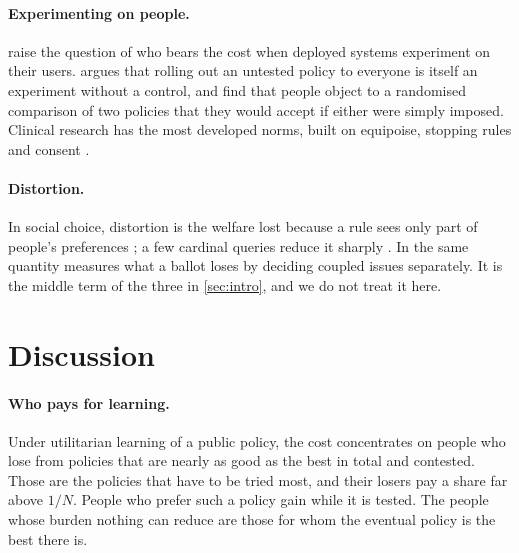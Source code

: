 \documentclass[11pt,a4paper]{article}
\theoremstyle{plain}
\theoremstyle{definition}
\theoremstyle{remark}
\begin{document}
\paragraph{Experimenting on people.} \citet{bird2016} raise the question of who bears the cost when deployed systems experiment on their users. \citet{meyer2015} argues that rolling out an untested policy to everyone is itself an experiment without a control, and \citet{meyer2019} find that people object to a randomised comparison of two policies that they would accept if either were simply imposed. Clinical research has the most developed norms, built on equipoise, stopping rules and consent \citep{freedman1987}.

\paragraph{Distortion.} In social choice, distortion is the welfare lost because a rule sees only part of people's preferences \citep{procaccia2006}; a few cardinal queries reduce it sharply \citep{amanatidis2021}. In \cite{telfar2026} the same quantity measures what a ballot loses by deciding coupled issues separately. It is the middle term of the three in \cref{sec:intro}, and we do not treat it here.

\section{Discussion}\label{sec:discussion}

\paragraph{Who pays for learning.} Under utilitarian learning of a public policy, the cost concentrates on people who lose from policies that are nearly as good as the best in total and contested. Those are the policies that have to be tried most, and their losers pay a share far above $1/N$. People who prefer such a policy gain while it is tested. The people whose burden nothing can reduce are those for whom the eventual policy is the best there is.
\end{document}
